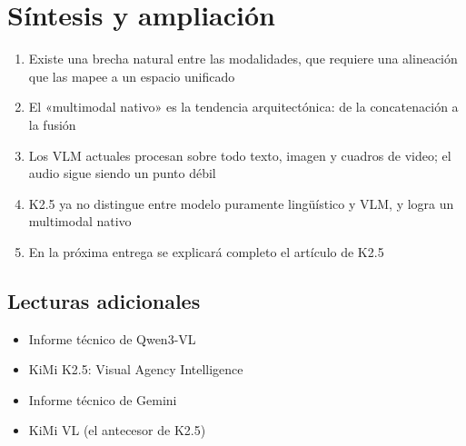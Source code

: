 \section{Síntesis y ampliación}

\begin{enumerate}
  \item Existe una brecha natural entre las modalidades, que requiere una alineación que las mapee a un espacio unificado
  \item El «multimodal nativo» es la tendencia arquitectónica: de la concatenación a la fusión
  \item Los VLM actuales procesan sobre todo texto, imagen y cuadros de video; el audio sigue siendo un punto débil
  \item K2.5 ya no distingue entre modelo puramente lingüístico y VLM, y logra un multimodal nativo
  \item En la próxima entrega se explicará completo el artículo de K2.5
\end{enumerate}

\subsection{Lecturas adicionales}
\begin{itemize}
  \item Informe técnico de Qwen3-VL
  \item KiMi K2.5: Visual Agency Intelligence
  \item Informe técnico de Gemini
  \item KiMi VL (el antecesor de K2.5)
\end{itemize}



